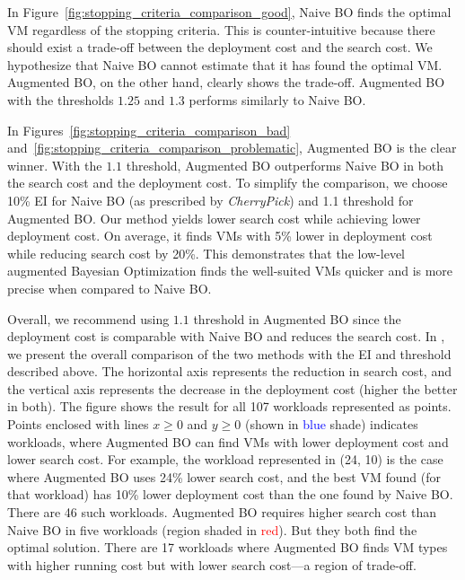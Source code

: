 In Figure~\ref{fig:stopping_criteria_comparison_good}, Naive BO finds the optimal VM regardless of the stopping criteria. This is counter-intuitive because there should exist a trade-off between the deployment cost and the search cost. We hypothesize that Naive BO cannot estimate that it has found the optimal VM. Augmented BO, on the other hand, clearly shows the trade-off. Augmented BO with the thresholds $1.25$ and $1.3$ performs similarly to Naive BO.

In Figures~\ref{fig:stopping_criteria_comparison_bad} and~\ref{fig:stopping_criteria_comparison_problematic}, Augmented BO is the clear winner. With the $1.1$ threshold, Augmented BO outperforms Naive BO in both
the search cost and the deployment cost. To simplify the comparison, we choose 10\% EI for Naive BO (as prescribed by \emph{CherryPick}) and 1.1 threshold for Augmented BO. Our method yields lower search cost while achieving lower deployment cost. On average, it finds VMs with 5\% lower in deployment cost while reducing search cost by 20\%.
This demonstrates that the low-level augmented Bayesian Optimization finds the well-suited VMs quicker and is more precise when compared to Naive BO.

Overall, we recommend using $1.1$ threshold in Augmented BO since
the deployment cost is comparable with Naive BO and reduces
the search cost.
In \myfigure{\ref{fig:comparison_cost}},
we present the overall comparison of the two methods with the EI and threshold
described above. The horizontal axis represents the reduction in search cost, and the vertical axis represents the decrease in the deployment cost (higher the better in both).
The figure shows the result for all 107 workloads represented as points. Points enclosed with lines $x \geq 0$ and $y \geq 0$ (shown in \textcolor{blue}{blue} shade) indicates workloads, where Augmented BO can find VMs with lower deployment cost and lower search cost. For example, the workload represented in (24, 10) is the case where Augmented BO uses 24\% lower search cost, and the best VM found (for that workload) has 10\% lower deployment cost than the one found by Naive BO. There are 46 such workloads.
Augmented BO requires higher search cost than Naive BO in five workloads (region shaded in \textcolor{red}{red}). But they both find the optimal solution.
There are 17 workloads where Augmented BO finds VM types with higher running cost
but with lower search cost---a region of trade-off.


